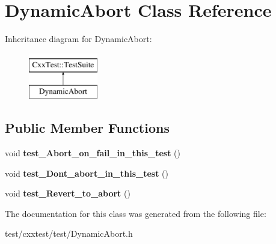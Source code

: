\hypertarget{classDynamicAbort}{\section{Dynamic\-Abort Class Reference}
\label{classDynamicAbort}
}
Inheritance diagram for Dynamic\-Abort\-:\begin{figure}[H]
\begin{center}
\leavevmode
\includegraphics[height=2.000000cm]{classDynamicAbort}
\end{center}
\end{figure}
\subsection*{Public Member Functions}
\begin{DoxyCompactItemize}
\item 
\hypertarget{classDynamicAbort_a2d9c1b9c3a7fd18603efca59a6d98922}{void {\bfseries test\-\_\-\-Abort\-\_\-on\-\_\-fail\-\_\-in\-\_\-this\-\_\-test} ()}\label{classDynamicAbort_a2d9c1b9c3a7fd18603efca59a6d98922}

\item 
\hypertarget{classDynamicAbort_ae3f6ec30e72c5c9f3b286569e4bd381c}{void {\bfseries test\-\_\-\-Dont\-\_\-abort\-\_\-in\-\_\-this\-\_\-test} ()}\label{classDynamicAbort_ae3f6ec30e72c5c9f3b286569e4bd381c}

\item 
\hypertarget{classDynamicAbort_a5db3b66a210c82e7151bb7d3645c93fb}{void {\bfseries test\-\_\-\-Revert\-\_\-to\-\_\-abort} ()}\label{classDynamicAbort_a5db3b66a210c82e7151bb7d3645c93fb}

\end{DoxyCompactItemize}


The documentation for this class was generated from the following file\-:\begin{DoxyCompactItemize}
\item 
test/cxxtest/test/Dynamic\-Abort.\-h\end{DoxyCompactItemize}
